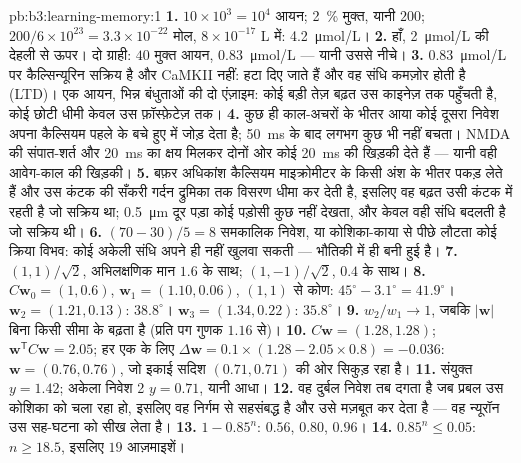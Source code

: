 \begin{solution}{pb:b3:learning-memory:1}
\textbf{1.} $10\times 10^{3} = 10^{4}$ आयन; \qty{2}{\%} मुक्त, यानी
$200$; $200/6\times 10^{23} = 3.3\times 10^{-22}$ मोल, $8\times 10^{-17}$ L
में: \qty{4.2}{\micro mol/L}।
\textbf{2.} हाँ, \qty{2}{\micro mol/L} की देहली से ऊपर। दो
ग्राही: $40$ मुक्त आयन, \qty{0.83}{\micro mol/L} --- यानी उससे नीचे।
\textbf{3.} \qty{0.83}{\micro mol/L} पर कैल्सिन्यूरिन सक्रिय है और
CaMKII नहीं:  हटा दिए जाते हैं और वह संधि कमज़ोर होती है
(LTD)। एक आयन, भिन्न बंधुताओं की दो एंज़ाइम: कोई बड़ी तेज़ बढ़त उस
काइनेज़ तक पहुँचती है, कोई छोटी धीमी केवल उस फ़ॉस्फ़ेटेज़ तक।
\textbf{4.} कुछ ही काल-अचरों के भीतर आया कोई दूसरा निवेश अपना कैल्सियम
पहले के बचे हुए में जोड़ देता है; \qty{50}{ms} के बाद लगभग कुछ भी नहीं
बचता। NMDA की संपात-शर्त और \qty{20}{ms} का क्षय मिलकर दोनों ओर कोई
\qty{20}{ms} की खिड़की देते हैं --- यानी वही आवेग-काल की खिड़की।
\textbf{5.} बफ़र अधिकांश कैल्सियम माइक्रोमीटर के किसी अंश के भीतर पकड़
लेते हैं और उस कंटक की सँकरी गर्दन द्रुमिका तक विसरण धीमा कर देती है,
इसलिए वह बढ़त उसी कंटक में रहती है जो सक्रिय था; \qty{0.5}{\micro m}
दूर पड़ा कोई पड़ोसी कुछ नहीं देखता, और केवल वही संधि बदलती है जो सक्रिय
थी।
\textbf{6.} $(70 - 30)/5 = 8$ समकालिक निवेश, या कोशिका-काया से पीछे
लौटता कोई क्रिया विभव: कोई अकेली संधि अपने ही  नहीं खुलवा
सकती ---  भौतिकी में ही बनी हुई है।
\textbf{7.} $(1,1)/\sqrt{2}$, अभिलक्षणिक मान $1.6$ के साथ;
$(1,-1)/\sqrt{2}$, $0.4$ के साथ।
\textbf{8.} $C\mathbf{w}_{0} = (1, 0.6)$, $\mathbf{w}_{1} = (1.10,
0.06)$, $(1,1)$ से कोण: $45^{\circ} - 3.1^{\circ} = 41.9^{\circ}$।
$\mathbf{w}_{2} = (1.21, 0.13)$: $38.8^{\circ}$। $\mathbf{w}_{3} = (1.34,
0.22)$: $35.8^{\circ}$।
\textbf{9.} $w_{2}/w_{1} \to 1$, जबकि $|\mathbf{w}|$ बिना किसी सीमा के
बढ़ता है (प्रति पग गुणक $1.16$ से)।
\textbf{10.} $C\mathbf{w} = (1.28, 1.28)$; $\mathbf{w}^{\mathsf{T}}C
\mathbf{w} = 2.05$; हर एक के लिए
$\Delta\mathbf{w} = 0.1\times(1.28 - 2.05\times 0.8)
= -0.036$: $\mathbf{w} = (0.76, 0.76)$, जो इकाई सदिश
$(0.71, 0.71)$ की ओर सिकुड़ रहा है।
\textbf{11.} संयुक्त $y = 1.42$; अकेला निवेश 2 $y = 0.71$, यानी आधा।
\textbf{12.} वह दुर्बल निवेश तब दगता है जब प्रबल उस कोशिका को चला रहा
हो, इसलिए वह निर्गम से सहसंबद्ध है और  उसे मज़बूत कर देता है
--- वह न्यूरॉन उस सह-घटना को सीख लेता है।
\textbf{13.} $1 - 0.85^{n}$: $0.56$, $0.80$, $0.96$।
\textbf{14.} $0.85^{n} \le 0.05$: $n \ge 18.5$, इसलिए $19$ आज़माइशें।

\end{solution}
